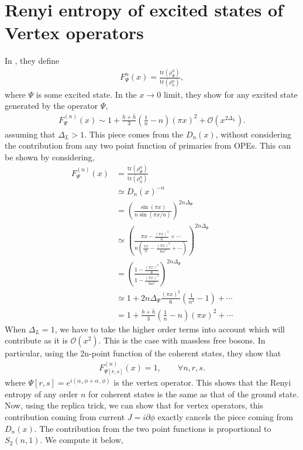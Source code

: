 \documentclass[11pt]{article}
\newcommand{\p}{\partial}
\newcommand{\mO}{\mathcal{O}}
\newcommand{\lb}{\left(}
\newcommand{\rb}{\right)}
\begin{document}
\section{Renyi entropy of excited states of Vertex operators}
In \cite{Alcaraz_2011}, they define 
\begin{align}
    F_{\Psi}^n(x) = \frac{\text{tr}(\rho_\Psi^n)}{\text{tr}(\rho_0^n)},
\end{align}
where $\Psi$ is some excited state. 
In the $x \to 0 $ limit, they show for any excited state generated by the operator $\Psi$,
\begin{align}
    F_\Psi^{(n)}(x) \sim 1+ \frac{h+\bar{h}}{3} \lb\frac{1}{n}-n\rb (\pi x)^2 + \mO(x^{2\Delta_{L}}).
\end{align}
assuming that $\Delta_L>1$.
This piece comes from the $D_n(x)$, without considering the contribution from any two point function of primaries from OPEs. This can be shown by considering,
\begin{align}
    F^{(n)}_\Psi(x) &= \frac{\text{tr}(\rho_\Psi^n)}{\text{tr}(\rho_0^n)} \\
    &\simeq D_n(x)^{-n} \\
    &= \lb\frac{\sin(\pi x)}{n\sin(\pi x/n)}\rb^{2n\Delta_\Psi} \\
    &\simeq \lb\frac{\pi x -\frac{(\pi x)^3}{6} + \cdots } {n \lb \frac{\pi x }{n} - \frac{(\pi x)^3}{6n^3} + \cdots\rb  }\rb^{2n\Delta_\Psi}\\
    &= \lb \frac{1 - \frac{(\pi x)^2}{6}}{1- \frac{(\pi x)^2}{6n^2}}  \rb^{2n\Delta_\Psi} \\
    &\simeq 1+ 2n\Delta_\Psi \frac{(\pi x)^2}{6}\lb\frac{1}{n^2} - 1\rb + \cdots \\
    &= 1+ \frac{h + \bar{h}}{3} \lb\frac{1}{n}-n\rb (\pi x)^2 + \cdots
\end{align}
When $\Delta_L = 1$, we have to take the higher order terms into account which will contribute as it is $\mO(x^2)$. This is the case with massless free bosons. 
In particular, using the 2n-point function of the coherent states, they show that 
\begin{align}
    F^{(n)}_{\Psi[r,s]}(x) = 1, \qquad \forall n,r,s. 
\end{align} 
where $\Psi[r,s] = e^{i (\alpha_+ \phi + \alpha_- \phi)}$
is the vertex operator. This shows that the Renyi entropy of any order $n$ for coherent states is the same as that of the ground state. 
Now, using the replica trick, we can show that for vertex operators, this contribution coming from current $J = i \p \phi$ exactly cancels the piece coming from $D_n(x)$. The contribution from the two point functions is proportional to $S_2(n,1)$. We compute it below,
\end{document}
